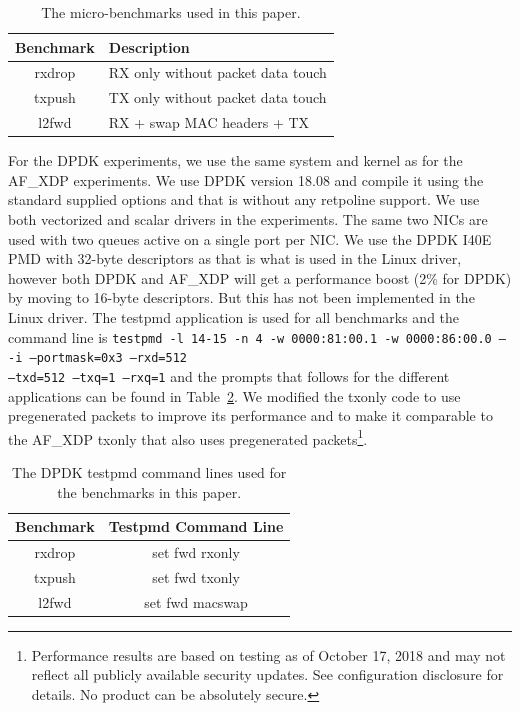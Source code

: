 \documentclass[9pt,numbers,reprint]{sigplanconf}
\begin{document}
\begin{table}[ht]
\centering
\begin{tabular}{|c|p{5.5cm}|} \hline
\textbf{Benchmark} & \textbf{Description} \\ \hline
rxdrop & RX only without packet data touch\\ \hline
txpush & TX only without packet data touch\\ \hline
l2fwd & RX + swap MAC headers + TX\\ \hline
\end{tabular}
\caption{The micro-benchmarks used in this paper.}
\label{table:benchmarks}
\end{table}

For the DPDK experiments, we use the same system and kernel as for the
AF\_XDP experiments. We use DPDK version 18.08 and compile it using
the standard supplied options and that is without any retpoline
support. We use both vectorized and scalar drivers in the
experiments. The same two NICs are used with two queues active on a
single port per NIC. We use the DPDK I40E PMD with 32-byte descriptors
as that is what is used in the Linux driver, however both DPDK and
AF\_XDP will get a performance boost (2\% for DPDK) by moving to
16-byte descriptors. But this has not been implemented in the Linux
driver. The testpmd application is used for all benchmarks and the
command line is \texttt{testpmd -l 14-15 -n 4 -w 0000:81:00.1 -w
  0000:86:00.0 -- -i --portmask=0x3 --rxd=512\\  --txd=512 --txq=1
  --rxq=1} and the prompts that follows for the different applications
can be found in Table~\ref{table:dpdk_commands}. We modified the
txonly code to use pregenerated packets to improve its performance and
to make it comparable to the AF\_XDP txonly that also uses
pregenerated packets\footnote{Performance results are based on testing
  as of October 17, 2018 and may not reflect all publicly available
  security updates. See configuration disclosure for details. No
  product can be absolutely secure.}.

\begin{table}[ht]
\centering
\begin{tabular}{|c|c|} \hline
\textbf{Benchmark} & \textbf{Testpmd Command Line} \\ \hline
rxdrop & set fwd rxonly\\ \hline
txpush & set fwd txonly\\ \hline
l2fwd & set fwd macswap\\ \hline
\end{tabular}
\caption{The DPDK testpmd command lines used for the benchmarks in
  this paper.}
\label{table:dpdk_commands}
\end{table}
\end{document}
